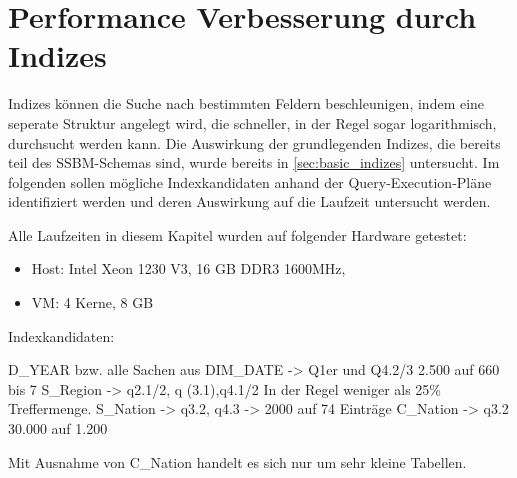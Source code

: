 \chapter{Performance Verbesserung durch Indizes}

Indizes können die Suche nach bestimmten Feldern beschleunigen, indem eine seperate Struktur angelegt wird, die schneller, in der Regel sogar logarithmisch, durchsucht werden kann.
Die Auswirkung der grundlegenden Indizes, die bereits teil des SSBM-Schemas sind, wurde bereits in \ref{sec:basic_indizes} untersucht. 
Im folgenden sollen mögliche Indexkandidaten anhand der Query-Execution-Pläne identifiziert werden und deren Auswirkung auf die Laufzeit untersucht werden.

Alle Laufzeiten in diesem Kapitel wurden auf folgender Hardware getestet:
\begin{itemize}
    \item Host: Intel Xeon 1230 V3, 16 GB DDR3 1600MHz, 
    \item VM: 4 Kerne, 8 GB
\end{itemize}

Indexkandidaten:

D_YEAR bzw. alle Sachen aus DIM_DATE -> Q1er und Q4.2/3 2.500 auf 660 bis 7
S_Region -> q2.1/2, q (3.1),q4.1/2 In der Regel weniger als 25\% Treffermenge.
S_Nation -> q3.2, q4.3 -> 2000 auf 74 Einträge
C_Nation -> q3.2 30.000 auf 1.200

Mit Ausnahme von C_Nation handelt es sich nur um sehr kleine Tabellen.




